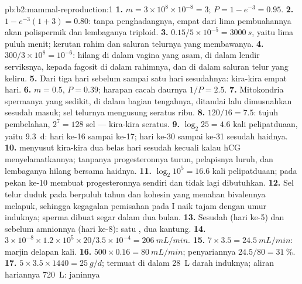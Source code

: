 \begin{solution}{pb:b2:mammal-reproduction:1}
\textbf{1.} $m = 3\times 10^{8}\times 10^{-8} = 3$; $P = 1 - e^{-3} =
0.95$.
\textbf{2.} $1 - e^{-3}(1 + 3) = 0.80$: tanpa penghadangnya, empat dari
lima pembuahannya akan polispermik dan lembaganya triploid.
\textbf{3.} $0.15/5\times 10^{-5} = \qty{3000}{s}$, yaitu lima puluh
menit; kerutan rahim dan saluran telurnya yang membawanya.
\textbf{4.} $300/3\times 10^{8} = 10^{-6}$: hilang di dalam vagina yang
asam, di dalam lendir serviksnya, kepada fagosit di dalam rahimnya, dan
di dalam saluran telur yang keliru.
\textbf{5.} Dari tiga hari sebelum  sampai satu hari
sesudahnya: kira-kira empat hari.
\textbf{6.} $m = 0.5$, $P = 0.39$; harapan cacah daurnya $1/P = 2.5$.
\textbf{7.} Mitokondria spermanya yang sedikit, di dalam bagian
tengahnya, ditandai lalu dimusnahkan sesudah masuk; sel telurnya
mengusung seratus ribu.
\textbf{8.} $120/16 = 7.5$: tujuh pembelahan, $2^{7} = 128$ sel ---
kira-kira seratus.
\textbf{9.} $\log_2 25 = 4.6$ kali pelipatduaan, yaitu \qty{9.3}{d}:
hari ke-16 sampai ke-17; hari ke-30 sampai ke-31 sesudah haidnya.
\textbf{10.}  menyusut kira-kira dua belas hari sesudah
 kecuali kalau hCG menyelamatkannya; tanpanya progesteronnya
turun, pelapisnya luruh, dan lembaganya hilang bersama haidnya.
\textbf{11.} $\log_2 10^{5} = 16.6$ kali pelipatduaan; pada pekan ke-10
 membuat progesteronnya sendiri dan  tidak
lagi dibutuhkan.
\textbf{12.} Sel telur duduk pada  berpuluh tahun dan kohesin
yang menahan bivalennya melapuk, sehingga kegagalan pemisahan pada
 I naik tajam dengan umur induknya; sperma dibuat segar dalam
dua bulan.
\textbf{13.} Sesudah  (hari ke-5) dan sebelum amnionnya
(hari ke-8): satu , dua kantung.
\textbf{14.} $3\times 10^{-8}\times 1.2\times 10^{5}\times 20/3.5\times
10^{-4} = \qty{206}{mL/min}$.
\textbf{15.} $7\times 3.5 = \qty{24.5}{mL/min}$: marjin delapan kali.
\textbf{16.} $500\times 0.16 = \qty{80}{mL/min}$; penyariannya
$24.5/80 = \qty{31}{\%}$.
\textbf{17.} $5\times 3.5\times 1440 = \qty{25}{g/d}$; termuat di dalam
\qty{28}{L} darah induknya; aliran hariannya \qty{720}{L}: janinnya

\end{solution}
